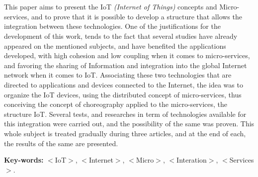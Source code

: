 \section*{} 
This paper aims to present the IoT \emph{(Internet of Things)} concepts and Micro-services, and to prove that it is possible to develop a structure that allows the integration between these technologies. One of the justifications for the development of this work, tends to the fact that several studies have already appeared on the mentioned subjects, and have benefited the applications developed, with high cohesion and low coupling when it comes to micro-services, and favoring the sharing of Information and integration into the global Internet network when it comes to IoT. Associating these two technologies that are directed to applications and devices connected to the Internet, the idea was to organize the IoT devices, using the distributed concept of micro-services, thus conceiving the concept of choreography applied to the micro-services, the structure IoT. Several tests, and researches in term of technologies available for this integration were carried out, and the possibility of the same was proven. This whole subject is treated gradually during three articles, and at the end of each, the results of the same are presented.

{\bf Key-words:} $<$IoT$>$,  $<$Internet$>$, $<$Micro$>$, $<$Interation$>$, $<$Services$>$.